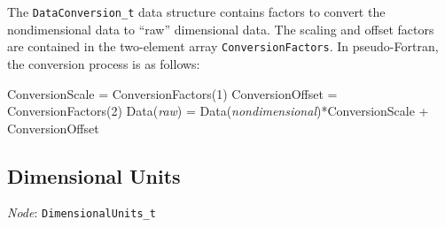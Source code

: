 The \texttt{DataConversion\_t} data structure contains factors to convert
the nondimensional data to ``raw'' dimensional data.
The scaling and offset factors are contained in the two-element array
\texttt{ConversionFactors}.
In pseudo-Fortran, the conversion process is as follows:

\begin{indlefttt}
ConversionScale  = ConversionFactors(1)
ConversionOffset = ConversionFactors(2)
Data(\textit{raw}) = Data(\textit{nondimensional})*ConversionScale + ConversionOffset
\end{indlefttt}

\subsection{Dimensional Units}
\label{s:dimensionalunits}

\noindent
\textit{Node}: \texttt{DimensionalUnits\_t}


